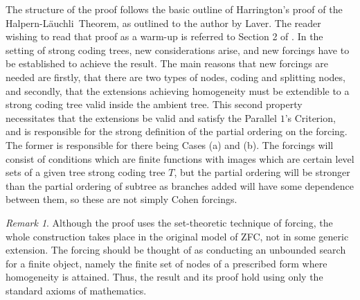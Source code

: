 \documentclass{amsart}
\theoremstyle{remark}
\newtheorem{rem}[thm]{Remark}
\theoremstyle{definition}
\theoremstyle{remark}
\newcommand{\POC}{Parallel $1$'s Criterion}
\newcommand{\Lauchli}{L{\"{a}}uchli}
\begin{document}
The structure of the proof follows the basic outline of Harrington's  proof of the
Halpern-\Lauchli\ Theorem, as outlined to the author by  Laver.
The reader wishing to read that proof as a warm-up is referred to  Section 2 of
 \cite{DobrinenRIMS17}.
In the setting of strong coding trees,
new considerations arise, and
 new forcings have to be established to achieve the result.
The main reasons that new
 forcings are needed are firstly, that
there are two types of nodes, coding and splitting nodes,
  and  secondly,  that the extensions achieving homogeneity must be  extendible to a strong coding tree valid inside the  ambient  tree.
This second property necessitates that  the extensions be valid and satisfy the \POC,
 and  is responsible for the strong definition of the partial ordering on the forcing.
The former is responsible for there being Cases (a) and (b).
The forcings will consist of conditions which
are finite functions with images which are
 certain level sets  of a given tree strong coding tree $T$, but the partial ordering will be stronger than the partial ordering of  subtree as branches added will have some dependence between them, so these are not simply Cohen forcings.



\begin{rem}
Although the
  proof  uses the set-theoretic technique of forcing,
the whole  construction takes place  in the original model of ZFC, not in  some generic extension.
The forcing should be thought of as conducting an unbounded search for a finite object, namely the finite set of nodes of  a  prescribed  form where homogeneity is attained.
Thus, the result and its proof
  hold  using only the standard axioms of mathematics.
\end{rem}
\end{document}
